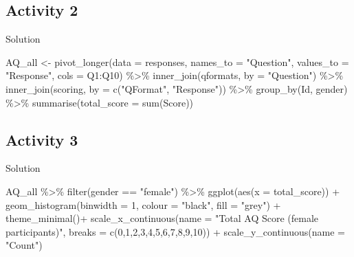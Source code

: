 \documentclass[
  oneside]{book}
\newenvironment{Shaded}{\begin{snugshade}}{\end{snugshade}}
\newcommand{\AttributeTok}[1]{\textcolor[rgb]{0.77,0.63,0.00}{#1}}
\newcommand{\DecValTok}[1]{\textcolor[rgb]{0.00,0.00,0.81}{#1}}
\newcommand{\FunctionTok}[1]{\textcolor[rgb]{0.00,0.00,0.00}{#1}}
\newcommand{\NormalTok}[1]{#1}
\newcommand{\OtherTok}[1]{\textcolor[rgb]{0.56,0.35,0.01}{#1}}
\newcommand{\SpecialCharTok}[1]{\textcolor[rgb]{0.00,0.00,0.00}{#1}}
\newcommand{\StringTok}[1]{\textcolor[rgb]{0.31,0.60,0.02}{#1}}
\begin{document}
\hypertarget{activity-2-3}{%
\subsection{Activity 2}\label{activity-2-3}}

Solution

\begin{Shaded}
\begin{Highlighting}[]
\NormalTok{AQ\_all }\OtherTok{\textless{}{-}} \FunctionTok{pivot\_longer}\NormalTok{(}\AttributeTok{data =}\NormalTok{ responses, }
                      \AttributeTok{names\_to =} \StringTok{"Question"}\NormalTok{,  }
                      \AttributeTok{values\_to =} \StringTok{"Response"}\NormalTok{,}
                      \AttributeTok{cols =}\NormalTok{ Q1}\SpecialCharTok{:}\NormalTok{Q10) }\SpecialCharTok{\%\textgreater{}\%}
  \FunctionTok{inner\_join}\NormalTok{(qformats, }\AttributeTok{by =} \StringTok{"Question"}\NormalTok{) }\SpecialCharTok{\%\textgreater{}\%}
  \FunctionTok{inner\_join}\NormalTok{(scoring, }\AttributeTok{by =} \FunctionTok{c}\NormalTok{(}\StringTok{"QFormat"}\NormalTok{, }\StringTok{"Response"}\NormalTok{)) }\SpecialCharTok{\%\textgreater{}\%}
  \FunctionTok{group\_by}\NormalTok{(Id, gender) }\SpecialCharTok{\%\textgreater{}\%} 
  \FunctionTok{summarise}\NormalTok{(}\AttributeTok{total\_score =} \FunctionTok{sum}\NormalTok{(Score))}
\end{Highlighting}
\end{Shaded}

\hypertarget{activity-3-4}{%
\subsection{Activity 3}\label{activity-3-4}}

Solution

\begin{Shaded}
\begin{Highlighting}[]
\NormalTok{AQ\_all }\SpecialCharTok{\%\textgreater{}\%}
  \FunctionTok{filter}\NormalTok{(gender }\SpecialCharTok{==} \StringTok{"female"}\NormalTok{) }\SpecialCharTok{\%\textgreater{}\%}
  \FunctionTok{ggplot}\NormalTok{(}\FunctionTok{aes}\NormalTok{(}\AttributeTok{x =}\NormalTok{ total\_score)) }\SpecialCharTok{+}
  \FunctionTok{geom\_histogram}\NormalTok{(}\AttributeTok{binwidth =} \DecValTok{1}\NormalTok{, }\AttributeTok{colour =} \StringTok{"black"}\NormalTok{, }\AttributeTok{fill =} \StringTok{"grey"}\NormalTok{) }\SpecialCharTok{+}
  \FunctionTok{theme\_minimal}\NormalTok{()}\SpecialCharTok{+}
  \FunctionTok{scale\_x\_continuous}\NormalTok{(}\AttributeTok{name =} \StringTok{"Total AQ Score (female participants)"}\NormalTok{, }\AttributeTok{breaks =} \FunctionTok{c}\NormalTok{(}\DecValTok{0}\NormalTok{,}\DecValTok{1}\NormalTok{,}\DecValTok{2}\NormalTok{,}\DecValTok{3}\NormalTok{,}\DecValTok{4}\NormalTok{,}\DecValTok{5}\NormalTok{,}\DecValTok{6}\NormalTok{,}\DecValTok{7}\NormalTok{,}\DecValTok{8}\NormalTok{,}\DecValTok{9}\NormalTok{,}\DecValTok{10}\NormalTok{)) }\SpecialCharTok{+}
  \FunctionTok{scale\_y\_continuous}\NormalTok{(}\AttributeTok{name =} \StringTok{"Count"}\NormalTok{)}
\end{Highlighting}
\end{Shaded}
\end{document}
